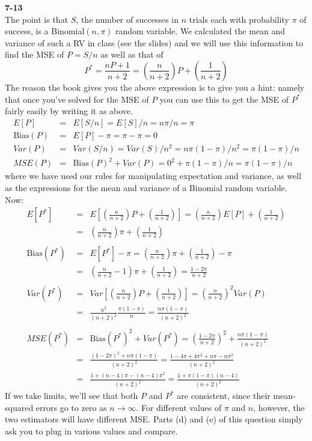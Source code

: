 \documentclass[addpoints,12pt]{exam}\usepackage[]{graphicx}\usepackage[]{color}
\begin{document}
\begin{questions}
  \item[]
    \begin{solution}
    \textbf{7-13}\\
The point is that $S$, the number of successes in $n$ trials each with probability $\pi$ of success, is a Binomial$(n,\pi)$ random variable. We calculated the mean and variance of such a RV in class (see the slides) and we will use this information to find the MSE of $P = S/n$ as well as that of
  $$P^* = \frac{nP + 1}{n+2} = \left(\frac{n}{n+2}\right)P + \left(\frac{1}{n+2}\right)$$
The reason the book gives you the above expression is to give you a hint: namely that once you've solved for the MSE of $P$ you can use this to get the MSE of $P^*$ fairly easily by writing it as above.
  \begin{eqnarray*}
		E[P] &=& E[S/n] = E[S]/n = n\pi/n = \pi\\ 
		\mbox{Bias}(P) &=& E[P] - \pi = \pi - \pi = 0\\ 
		Var(P) &=& Var(S/n) = Var(S)/n^2 = n\pi(1-\pi)/n^2 = \pi(1-\pi)/n \\ 
		MSE(P) &=& \mbox{Bias}(P)^2 + Var(P) = 0^2 + \pi(1-\pi)/n = \pi(1-\pi)/n
	\end{eqnarray*}
where we have used our rules for manipulating expectation and variance, as well as the expressions for the mean and variance of a Binomial random variable. Now:
	\begin{eqnarray*}
		E[P^*] &=& E\left[ \left(\frac{n}{n+2}\right)P + \left(\frac{1}{n+2}\right)\right]=  \left(\frac{n}{n+2}\right)E[P] + \left(\frac{1}{n+2}\right)\\
			&=&  \left(\frac{n}{n+2}\right)\pi + \left(\frac{1}{n+2}\right)\\\\
		\mbox{Bias}(P^*) &=& E[P^*] - \pi =  \left(\frac{n}{n+2}\right)\pi + \left(\frac{1}{n+2}\right) - \pi\\
			&=&\left(\frac{n}{n+2} -1\right)\pi + \left(\frac{1}{n+2}\right) = \frac{1-2\pi}{n+2}\\\\
		Var(P^*) &=& Var\left[  \left(\frac{n}{n+2}\right)P + \left(\frac{1}{n+2}\right)\right] = \left(\frac{n}{n+2}\right)^2 Var(P)\\
		&=& \frac{n^2}{(n+2)^2} \frac{\pi(1-\pi)}{n} = \frac{n\pi(1-\pi)}{(n+2)^2}\\ \\ 
		MSE(P^*) &=& \mbox{Bias}(P^*)^2 + Var(P^*) = \left(\frac{1-2\pi}{n+2}\right)^2 + \frac{n\pi(1-\pi)}{(n+2)^2}\\
			&=& \frac{(1-2\pi)^2 + n\pi(1-\pi)}{(n+2)^2} = \frac{1 - 4\pi + 4\pi^2 + n\pi - n\pi^2}{(n+2)^2}\\
			&=& \frac{1 + (n-4)\pi - (n-4)\pi^2 }{(n+2)^2} =\frac{1 + \pi(1-\pi)(n-4)}{(n+2)^2}
	\end{eqnarray*}
	If we take limits, we'll see that both $P$ and $P^*$ are consistent, since their mean-squared errors go to zero as $n\rightarrow  \infty$. For different values of $\pi$ and $n$, however, the two estimators will have different MSE. Parts (d) and (e) of this question simply ask you to plug in various values and compare.


\end{solution}
\end{questions}
\end{document}
